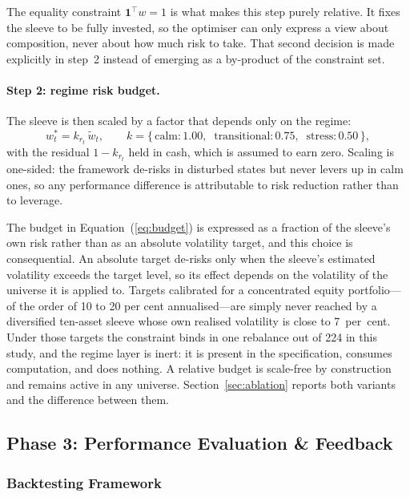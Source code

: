 The equality constraint $\mathbf{1}^{\top} w = 1$ is what makes this step purely relative.
It fixes the sleeve to be fully invested, so the optimiser can only express a view about
composition, never about how much risk to take. That second decision is made explicitly
in step~2 instead of emerging as a by-product of the constraint set.

\paragraph{Step 2: regime risk budget.} The sleeve is then scaled by a factor that depends
only on the regime:
\begin{equation}
w^{\ast}_t = k_{r_t} \, \tilde{w}_t, \qquad
k = \{\,\text{calm}: 1.00, \;\; \text{transitional}: 0.75, \;\; \text{stress}: 0.50\,\},
\label{eq:budget}
\end{equation}
with the residual $1 - k_{r_t}$ held in cash, which is assumed to earn zero. Scaling is
one-sided: the framework de-risks in disturbed states but never levers up in calm ones,
so any performance difference is attributable to risk reduction rather than to leverage.

The budget in Equation~(\ref{eq:budget}) is expressed as a fraction of the sleeve's own
risk rather than as an absolute volatility target, and this choice is consequential. An
absolute target de-risks only when the sleeve's estimated volatility exceeds the target
level, so its effect depends on the volatility of the universe it is applied to. Targets
calibrated for a concentrated equity portfolio---of the order of 10 to 20 per cent
annualised---are simply never reached by a diversified ten-asset sleeve whose own realised
volatility is close to 7~per~cent. Under those targets the constraint binds in one
rebalance out of 224 in this study, and the regime layer is inert: it is present in the
specification, consumes computation, and does nothing. A relative budget is scale-free by
construction and remains active in any universe. Section~\ref{sec:ablation} reports both
variants and the difference between them.

\subsection{Phase 3: Performance Evaluation \& Feedback}

\subsubsection{Backtesting Framework}

